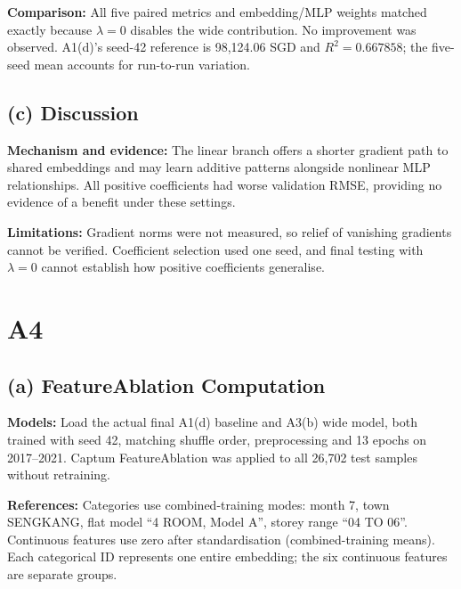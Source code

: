 \documentclass[10pt,a4paper]{article}
\begin{document}
\textbf{Comparison:} All five paired metrics and embedding/MLP weights matched exactly because $\lambda=0$ disables the wide contribution. No improvement was observed. A1(d)'s seed-42 reference is 98,124.06 SGD and $R^2=0.667858$; the five-seed mean accounts for run-to-run variation.
\subsection*{(c) Discussion}

\textbf{Mechanism and evidence:} The linear branch offers a shorter gradient path to shared embeddings and may learn additive patterns alongside nonlinear MLP relationships. All positive coefficients had worse validation RMSE, providing no evidence of a benefit under these settings.

\textbf{Limitations:} Gradient norms were not measured, so relief of vanishing gradients cannot be verified. Coefficient selection used one seed, and final testing with $\lambda=0$ cannot establish how positive coefficients generalise.
\section*{A4}
\subsection*{(a) FeatureAblation Computation}

\textbf{Models:} Load the actual final A1(d) baseline and A3(b) wide model, both trained with seed 42, matching shuffle order, preprocessing and 13 epochs on 2017--2021. Captum FeatureAblation was applied to all 26,702 test samples without retraining.

\textbf{References:} Categories use combined-training modes: month 7, town SENGKANG, flat model ``4 ROOM, Model A'', storey range ``04 TO 06''. Continuous features use zero after standardisation (combined-training means). Each categorical ID represents one entire embedding; the six continuous features are separate groups.
\end{document}
